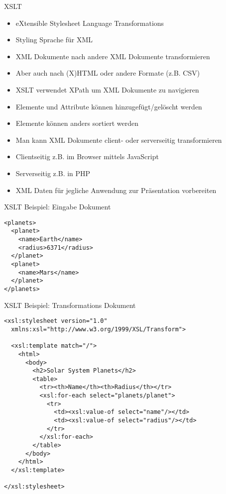 \documentclass{beamer}
\begin{document}
\begin{frame}{XSLT}
	
	\begin{itemize}
		\item eXtensible Stylesheet Language Transformations
		\item Styling Sprache für XML
		\item XML Dokumente nach andere XML Dokumente transformieren
		\item Aber auch nach (X)HTML oder andere Formate (z.B. CSV)
		\item XSLT verwendet XPath um XML Dokumente zu navigieren
		\item Elemente und Attribute können hinzugefügt/gelöscht werden
		\item Elemente können anders sortiert werden
		\item Man kann XML Dokumente client- oder serverseitig transformieren
		\item Clientseitig z.B. im Browser mittels JavaScript
		\item Serverseitig z.B. in PHP
		\item XML Daten für jegliche Anwendung zur Präsentation vorbereiten
	\end{itemize}
	
\end{frame}

\begin{frame}[fragile]{XSLT Beispiel: Eingabe Dokument}
	
	\lstset{language=XML}
	\begin{lstlisting}
<planets>
  <planet>
    <name>Earth</name>
    <radius>6371</radius>
  </planet>
  <planet>
    <name>Mars</name>
  </planet>
</planets>
	\end{lstlisting}
	
\end{frame}


\begin{frame}[fragile]{XSLT Beispiel: Transformations Dokument}
	
	\lstset{language=XML}\scriptsize
	\begin{lstlisting}
<xsl:stylesheet version="1.0"
  xmlns:xsl="http://www.w3.org/1999/XSL/Transform">

  <xsl:template match="/">
    <html>
      <body>
        <h2>Solar System Planets</h2>
        <table>
          <tr><th>Name</th><th>Radius</th></tr>
          <xsl:for-each select="planets/planet">
            <tr>
              <td><xsl:value-of select="name"/></td>
              <td><xsl:value-of select="radius"/></td>
            </tr>
          </xsl:for-each>
        </table>
      </body>
    </html>
  </xsl:template>

</xsl:stylesheet>
	\end{lstlisting}
	
\end{frame}
\end{document}
